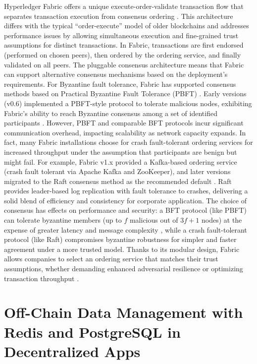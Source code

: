 \documentclass[a4paper,10pt]{report}
\begin{document}
Hyperledger Fabric offers a unique execute-order-validate transaction flow that separates transaction execution from consensus ordering \cite{androulaki2018fabric}.  This architecture differs with the typical “order-execute” model of older blockchains and addresses performance issues by allowing simultaneous execution and fine-grained trust assumptions for distinct transactions.  In Fabric, transactions are first endorsed (performed on chosen peers), then ordered by the ordering service, and finally validated on all peers.  The pluggable consensus architecture means that Fabric can support alternative consensus mechanisms based on the deployment’s requirements.  For Byzantine fault tolerance, Fabric has supported consensus methods based on Practical Byzantine Fault Tolerance (PBFT) \cite{castro2002pbft}.  Early versions (v0.6) implemented a PBFT-style protocol to tolerate malicious nodes, exhibiting Fabric’s ability to reach Byzantine consensus among a set of identified participants \cite{androulaki2018fabric}.  However, PBFT and comparable BFT protocols incur significant communication overhead, impacting scalability as network capacity expands.  In fact, many Fabric installations choose for crash fault-tolerant ordering services for increased throughput under the assumption that participants are benign but might fail.  For example, Fabric v1.x provided a Kafka-based ordering service (crash fault tolerant via Apache Kafka and ZooKeeper), and later versions migrated to the Raft consensus method as the recommended default \cite{brotsis2020fabric}.  Raft provides leader-based log replication with fault tolerance to crashes, delivering a solid blend of efficiency and consistency for corporate application.  The choice of consensus has effects on performance and security: a BFT protocol (like PBFT) can tolerate byzantine members (up to $f$ malicious out of $3f+1$ nodes) at the expense of greater latency and message complexity \cite{castro2002pbft}, while a crash fault-tolerant protocol (like Raft) compromises byzantine robustness for simpler and faster agreement under a more trusted model.  Thanks to its modular design, Fabric allows companies to select an ordering service that matches their trust assumptions, whether demanding enhanced adversarial resilience or optimizing transaction throughput \cite{androulaki2018fabric,brotsis2020fabric}.

\section{Off-Chain Data Management with Redis and PostgreSQL in Decentralized Apps}
\end{document}

